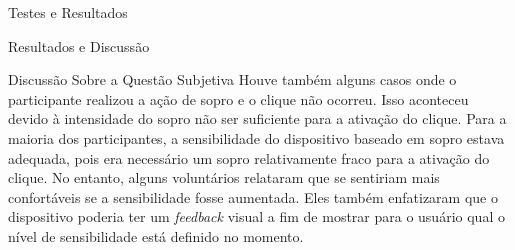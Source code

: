 \begin{chapter}{Testes e Resultados}
\begin{section}{Resultados e Discussão}
\begin{subsection}{Discussão Sobre a Questão Subjetiva}
Houve também alguns casos onde o participante realizou a ação de sopro e o
clique não ocorreu. Isso aconteceu devido à intensidade do sopro não ser
suficiente para a ativação do clique. Para a maioria dos participantes, a
sensibilidade do dispositivo baseado em sopro estava adequada, pois era
necessário um sopro relativamente fraco para a ativação do clique. No entanto,
alguns voluntários relataram que se sentiriam mais confortáveis se a
sensibilidade fosse aumentada. %
Eles também enfatizaram que o  dispositivo poderia ter um \textit{feedback}
visual a fim de mostrar para o usuário qual o nível de sensibilidade está
definido no momento.


\end{subsection}

\end{section}

\end{chapter}
